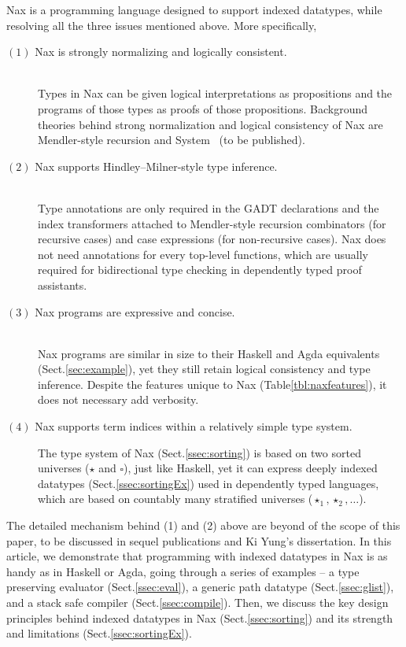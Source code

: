 Nax is a programming language designed to support indexed datatypes,
while resolving all the three issues mentioned above.
More specifically,
\begin{description}
\item[$(1)$ Nax is strongly normalizing and logically consistent.]~\\
Types in Nax can be given logical interpretations as propositions
and the programs of those types as proofs of those propositions.
Background theories behind strong normalization and logical consistency of Nax
are Mendler-style recursion \cite{AhnShe11} and System \Fi\ (to be published).

\item[$(2)$ Nax supports Hindley--Milner-style type inference.]~\\
Type annotations are only required in the GADT declarations and
the index transformers attached to Mendler-style recursion combinators
(for recursive cases) and case expressions (for non-recursive cases).
Nax does not need annotations for every top-level functions, which are usually
required for bidirectional type checking in dependently typed proof assistants.

\item[$(3)$ Nax programs are expressive and concise.]~\\
Nax programs are similar in size to their Haskell and Agda equivalents
(Sect.\;\ref{sec:example}), yet they still retain logical consistency
and type inference. Despite the features unique to Nax
(Table\;\ref{tbl:naxfeatures}), it does not necessary add verbosity.

\item[$(4)$ Nax supports term indices within a relatively simple type system.]
The type system of Nax (Sect.\;\ref{ssec:sorting}) is based on
two sorted universes ($\star$ and $\square$), just like Haskell,
yet it can express deeply indexed datatypes (Sect.\;\ref{ssec:sortingEx})
used in dependently typed languages, which are based on countably many
stratified universes ($\star_1,\star_2,\dots$).
\end{description}
The detailed mechanism behind (1) and (2) above are beyond of the scope of
this paper, to be discussed in sequel publications and Ki Yung's dissertation.
In this article, we demonstrate that programming with indexed datatypes in Nax
is as handy as in Haskell or Agda, going through a series of examples --
a type preserving evaluator (Sect.\;\ref{ssec:eval}),
a generic path datatype (Sect.\;\ref{ssec:glist}), and
a stack safe compiler (Sect.\;\ref{ssec:compile}).
Then, we discuss the key design principles behind indexed datatypes in Nax
(Sect.\;\ref{ssec:sorting}) and its strength and limitations
(Sect.\;\ref{ssec:sortingEx}).

